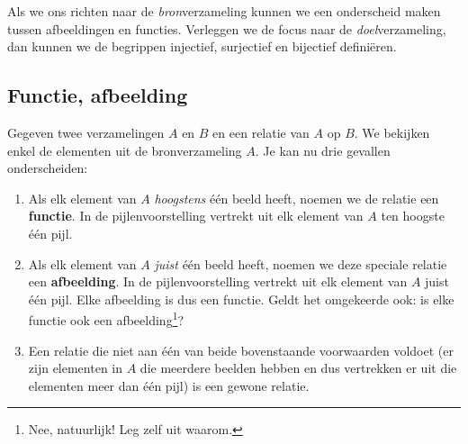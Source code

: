 Als we ons richten naar de \emph{bron}verzameling kunnen we een onderscheid maken tussen afbeeldingen en functies. Verleggen we de focus naar de \emph{doel}ver\-za\-me\-ling, dan kunnen we de begrippen injectief, surjectief en bijectief definiëren.

\subsection{Functie, afbeelding} \label{subsec:functies}
Gegeven twee verzamelingen $A$ en $B$ en een relatie van $A$ op $B$. We bekijken enkel de elementen uit de bronverzameling $A$. Je kan nu drie gevallen onderscheiden:
\begin{enumerate}
  \item Als elk element van $A$ \emph{hoogstens} één beeld heeft, noemen we de relatie een \textbf{functie}. In de pijlenvoorstelling vertrekt uit elk element van $A$ ten hoogste één pijl.
  \item Als elk element van $A$ \emph{juist} één beeld heeft, noemen we deze speciale relatie een \textbf{afbeelding}.
        In de pijlenvoorstelling vertrekt uit elk element van $A$ juist één pijl. Elke afbeelding is dus een functie. Geldt het omgekeerde ook: is elke functie ook een afbeelding\footnote{Nee, natuurlijk! Leg zelf uit waarom.}?
  \item Een relatie die niet aan één van beide bovenstaande voorwaarden voldoet (er zijn elementen in $A$ die meerdere beelden hebben en dus vertrekken er uit die elementen meer dan één pijl) is een gewone relatie.
\end{enumerate}

